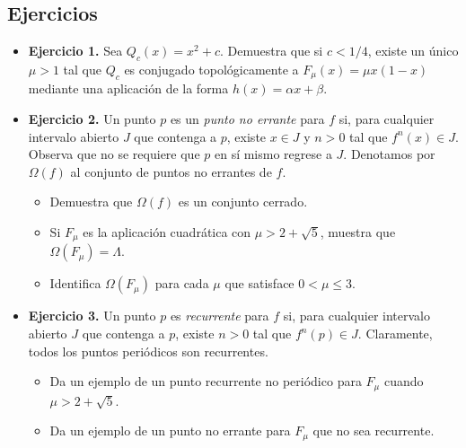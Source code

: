 \documentclass[10pt,a4paper]{book}
\begin{document}
\subsection{Ejercicios}
\begin{itemize}

\item \textbf{Ejercicio 1.} Sea $Q_c(x) = x^2 + c$. Demuestra que si $c < 1/4$, existe un único $\mu > 1$ tal que $Q_c$ es conjugado topológicamente a $F_\mu(x) = \mu x(1 - x)$ mediante una aplicación de la forma $h(x) = \alpha x + \beta$.

\item \textbf{Ejercicio 2.} Un punto $p$ es un \textit{punto no errante} para $f$ si, para cualquier intervalo abierto $J$ que contenga a $p$, existe $x \in J$ y $n > 0$ tal que $f^n(x) \in J$. Observa que no se requiere que $p$ en sí mismo regrese a $J$. Denotamos por $\Omega(f)$ al conjunto de puntos no errantes de $f$.
    \begin{itemize}
        \item[a)] Demuestra que $\Omega(f)$ es un conjunto cerrado.
        \item[b)] Si $F_\mu$ es la aplicación cuadrática con $\mu > 2 + \sqrt{5}$, muestra que $\Omega(F_\mu) = \Lambda$.
        \item[c)] Identifica $\Omega(F_\mu)$ para cada $\mu$ que satisface $0 < \mu \leq 3$.
    \end{itemize}

\item \textbf{Ejercicio 3.} Un punto $p$ es \textit{recurrente} para $f$ si, para cualquier intervalo abierto $J$ que contenga a $p$, existe $n > 0$ tal que $f^n(p) \in J$. Claramente, todos los puntos periódicos son recurrentes.
    \begin{itemize}
        \item[a)] Da un ejemplo de un punto recurrente no periódico para $F_\mu$ cuando $\mu > 2 + \sqrt{5}$.
        \item[b)] Da un ejemplo de un punto no errante para $F_\mu$ que no sea recurrente.
    \end{itemize}


\end{itemize}
\end{document}
